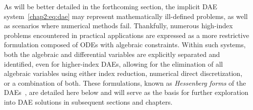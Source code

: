 As will be better detailed in the forthcoming section, the implicit \ac{DAE} system~\eqref{chap2:eq:dae} may represent mathematically ill-defined problems, as well as scenarios where numerical methods fail. Thankfully, numerous high-index problems encountered in practical applications are expressed as a more restrictive formulation composed of \acp{ODE} with algebraic constraints. Within such systems, both the algebraic and differential variables are explicitly separated and identified, even for higher-index \acp{DAE}, allowing for the elimination of all algebraic variables using either index reduction, numerical direct discretization, or a combination of both. These formulations, known as \emph{Hessenberg forms} of the \acp{DAE}~\cite{brenan1995numerical}, are detailed here below and will serve as the basis for further exploration into \ac{DAE} solutions in subsequent sections and chapters.
%
